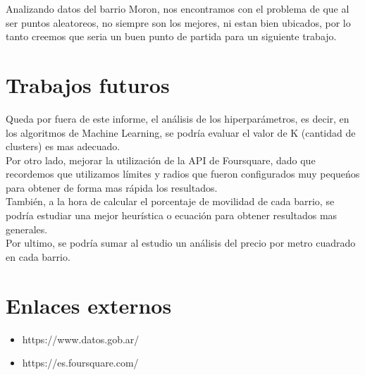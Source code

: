 \documentclass[12pt,a4paper]{tesis}
\begin{document}
Analizando datos del barrio Moron, nos encontramos con el problema de que al ser puntos aleatoreos, no siempre son los mejores, ni estan bien ubicados, por lo tanto creemos que seria un buen punto de partida para un siguiente trabajo.

\chapter{Trabajos futuros}
Queda por fuera de este informe, el análisis de los hiperparámetros, es decir, en los algoritmos de Machine Learning, se podría evaluar el valor de K (cantidad de clusters) es mas adecuado.\\

Por otro lado, mejorar la utilización de la API de Foursquare, dado que recordemos que utilizamos límites y radios que fueron configurados muy pequeńos para obtener de forma mas rápida los resultados.\\

También, a la hora de calcular el porcentaje de movilidad de cada barrio, se podría estudiar una mejor heurística o ecuación para obtener resultados mas generales.\\

Por ultimo, se podría sumar al estudio un análisis del precio por metro cuadrado en cada barrio.\\
\chapter{Enlaces externos}
\begin{itemize}
\item https://www.datos.gob.ar/
\item https://es.foursquare.com/
\end{itemize}
\end{document}
